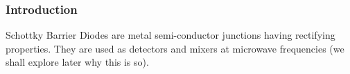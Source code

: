\begin{frame}
  \frametitle{Introduction}
  Schottky Barrier Diodes are metal semi-conductor junctions having rectifying properties.
  They are used as detectors and mixers at microwave frequencies (we shall explore later why this is so).
\end{frame}
